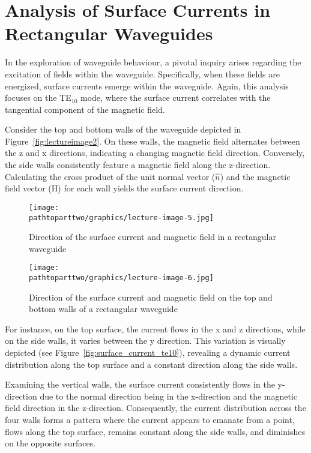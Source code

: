\section{Analysis of Surface Currents in Rectangular Waveguides}
In the exploration of waveguide behaviour, a pivotal inquiry arises regarding the excitation of fields within the waveguide. Specifically, when these fields are energized, surface currents emerge within the waveguide. Again,  this analysis focuses on the TE$_{10}$ mode, where the surface current correlates with the tangential component of the magnetic field.

Consider the top and bottom walls of the waveguide depicted in Figure~\ref{fig:lectureimage2}. On these walls, the magnetic field alternates between the z and x directions, indicating a changing magnetic field direction. Conversely, the side walls consistently feature a magnetic field along the z-direction. Calculating the cross product of the unit normal vector ($\hat{n}$) and the magnetic field vector (H) for each wall yields the surface current direction.
\begin{figure}[h]
\centering
\texttt{[image: \\pathtoparttwo/graphics/lecture-image-5.jpg]}
\caption{Direction of the surface current and magnetic field in a rectangular waveguide}
\label{fig:lectureimage5}
\end{figure}
\begin{figure}[h]
\centering
\texttt{[image: \\pathtoparttwo/graphics/lecture-image-6.jpg]}
\caption{Direction of the surface current and magnetic field on the top and bottom walls of a rectangular waveguide}
\label{fig:lectureimage6}
\end{figure}

For instance, on the top surface, the current flows in the x and z directions, while on the side walls, it varies between the y direction. This variation is visually depicted (see Figure~\ref{fig:surface_current_te10}), revealing a dynamic current distribution along the top surface and a constant direction along the side walls.

Examining the vertical walls, the surface current consistently flows in the y-direction due to the normal direction being in the x-direction and the magnetic field direction in the z-direction. Consequently, the current distribution across the four walls forms a pattern where the current appears to emanate from a point, flows along the top surface, remains constant along the side walls, and diminishes on the opposite surfaces.

